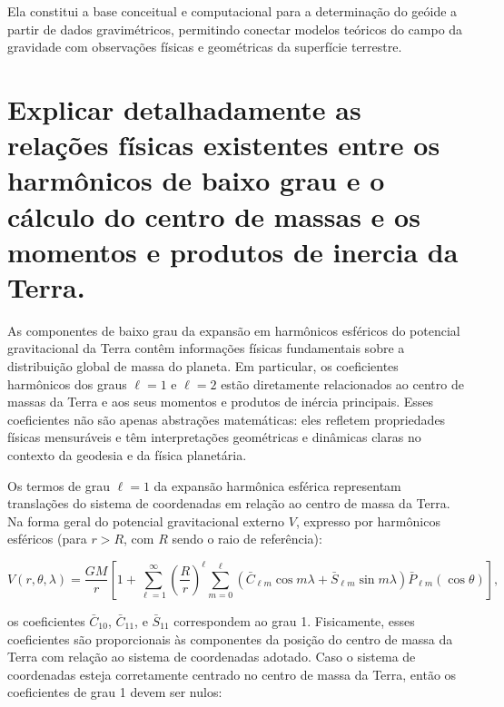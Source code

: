 Ela constitui a base conceitual e computacional para a determinação do geóide a partir de dados gravimétricos, permitindo conectar modelos teóricos do campo da gravidade com observações físicas e geométricas da superfície terrestre.


\section{Explicar detalhadamente as relações físicas existentes entre os harmônicos de baixo grau e o cálculo do centro de massas e os momentos e produtos de inercia da Terra.}

As componentes de baixo grau da expansão em harmônicos esféricos do potencial gravitacional da Terra contêm informações físicas fundamentais sobre a distribuição global de massa do planeta. Em particular, os coeficientes harmônicos dos graus \( \ell = 1 \) e \( \ell = 2 \) estão diretamente relacionados ao centro de massas da Terra e aos seus momentos e produtos de inércia principais. Esses coeficientes não são apenas abstrações matemáticas: eles refletem propriedades físicas mensuráveis e têm interpretações geométricas e dinâmicas claras no contexto da geodesia e da física planetária.

Os termos de grau \( \ell = 1 \) da expansão harmônica esférica representam translações do sistema de coordenadas em relação ao centro de massa da Terra. Na forma geral do potencial gravitacional externo \( V \), expresso por harmônicos esféricos (para \( r > R \), com \( R \) sendo o raio de referência):

\[
V(r, \theta, \lambda) = \frac{GM}{r} \left[ 1 + \sum_{\ell=1}^{\infty} \left( \frac{R}{r} \right)^\ell \sum_{m=0}^{\ell} \left( \bar{C}_{\ell m} \cos m\lambda + \bar{S}_{\ell m} \sin m\lambda \right) \bar{P}_{\ell m}(\cos \theta) \right] \text{,}
\]

os coeficientes \( \bar{C}_{10} \), \( \bar{C}_{11} \), e \( \bar{S}_{11} \) correspondem ao grau 1. Fisicamente, esses coeficientes são proporcionais às componentes da posição do centro de massa da Terra com relação ao sistema de coordenadas adotado. Caso o sistema de coordenadas esteja corretamente centrado no centro de massa da Terra, então os coeficientes de grau 1 devem ser nulos:

